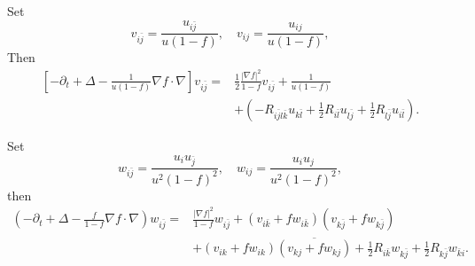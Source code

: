 \documentclass[10pt,a4paper]{amsart}
\begin{document}
\begin{lemma}\label{lemma:2.2}
Set
\[v_{i \bar{j}}=\frac{u_{i \bar{j}}}{u(1-f)}, \quad v_{i j}=\frac{u_{i j}}{u(1-f)},
\]
Then
\[
  \begin{aligned}
    \left[-\partial_t  + \Delta-\frac{1}{u(1-f)} \nabla f \cdot \nabla\right] v_{i \bar{j}} =&\frac{1}{2} \frac{|\nabla f|^2}{1-f} v_{i \bar{j}} +\frac{1}{u(1-f)} \\
    & +\left(-R_{i \bar{j} l \bar{k}} u_{k \bar{l}}+\frac{1}{2} R_{i \bar{l}} u_{l\bar{j}}+\frac{1}{2} R_{l \bar{j}} u_{i \bar{l}}\right).
  \end{aligned}
\]
\end{lemma}

\begin{lemma}
    Set \[w_{i \bar{j}}=\frac{u_i u_{\bar{j}}}{u^2(1-f)^2}, \quad w_{i j}=\frac{u_i u_j}{u^2(1-f)^2},\]
    then
    \[
        \begin{aligned}
         \left(-\partial_t+\Delta-\frac{f}{1-f} \nabla f \cdot \nabla\right) w_{i \bar{j}}=&\frac{|\nabla f|^2}{1-f} w_{i \bar{j}}+\left(v_{i \bar{k}}+f w_{i \bar{k}}\right)\left(v_{k \bar{j}}+f w_{k \bar{j}}\right) \\
        & +\left(v_{i k}+f w_{i k}\right) \overline{\left(v_{kj}+f w_{kj}\right)}+\frac{1}{2} R_{i \bar{k}} w_{k \bar{j}}+\frac{1}{2} R_{k \bar{j}} w_{\bar{k} i}.
        \end{aligned}
    \]
\end{lemma}
\end{document}
